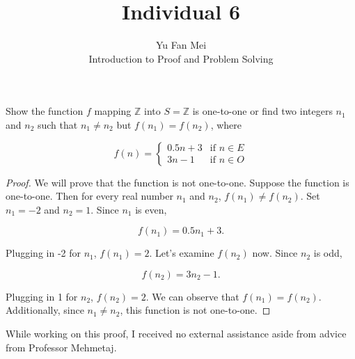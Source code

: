 \documentclass[12pt]{article}
\newenvironment{problem}[2][Problem]{\begin{trivlist}
\item[\hskip \labelsep {\bfseries #1}\hskip \labelsep {\bfseries #2.}]}{\end{trivlist}}
\begin{document}

\title{Individual 6}%
\author{Yu Fan Mei\\ %
	Introduction to Proof and Problem Solving} %

\maketitle

\begin{problem}{12} %
    Show the function $f$ mapping $\mathbb{Z}$ into $S = \mathbb{Z} $ is one-to-one or find two integers $n_1$ and $n_2$ such that $n_1 \neq n_2$ but $f(n_1) = f(n_2)$, where

    $$f(n) = 
        \begin{cases} 
        0.5n + 3 & \text{if } n \in E \\ 
        3n - 1 & \text{if } n \in O 
        \end{cases}$$


    
    

\end{problem}

\begin{proof} We will prove that the function is not one-to-one. Suppose the function is one-to-one. Then for every real number $n_1$ and $n_2$, $f(n_1) \neq f(n_2)$. Set $n_1 = -2$ and $n_2 = 1$. Since $n_1$ is even, 

        $$f(n_1) = 0.5n_1 + 3.$$
    
    Plugging in -2 for $n_1$, $f(n_1) = 2$. Let's examine $f(n_2)$ now. Since $n_2$ is odd,


        $$f(n_2) = 3n_2 - 1.$$
    
    Plugging in 1 for $n_2$, $f(n_2) = 2$. We can observe that $f(n_1) = f(n_2)$. Additionally, since $n_1 \neq n_2$, this function is not one-to-one.


\end{proof}


\noindent While working on this proof, I received no external assistance aside from advice from Professor Mehmetaj.
\end{document}
